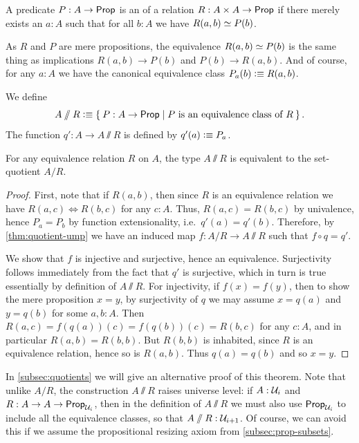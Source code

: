 \begin{defn}
  A predicate $P:A\to\mathsf{Prop}$ is an 
  of a relation $R : A \times A \to \mathsf{Prop}$ if there merely exists an $a:A$ such that for all $b:A$ we have $R(a,b) \simeq P(b)$.
\end{defn}

As $R$ and $P$ are mere propositions, the equivalence $R(a,b) \simeq P(b)$ is the same thing as implications $R(a,b) \to P(b)$ and $P(b) \to R(a,b)$.
And of course, for any $a:A$ we have the canonical equivalence class $P_a(b) \vcentcolon\equiv R(a,b)$.

\begin{defn}\label{def:VVquotient}
  We define
  \begin{equation*}
    A\sslash R \defeq \setof{ P:A\to\prop | P \text{ is an equivalence class of } R}.
  \end{equation*}
  The function $q':A\to A\sslash R$ is defined by $q'(a) \vcentcolon\equiv P_a$.
\end{defn}

\begin{thm}
  For any equivalence relation $R$ on $A$, the type $A\sslash R$ is equivalent to the set-quotient $A/R$.
\end{thm}
\begin{proof}
  First, note that if $R(a,b)$, then since $R$ is an equivalence relation we have $R(a,c) \Leftrightarrow R(b,c)$ for any $c:A$.
  Thus, $R(a,c) = R(b,c)$ by univalence, hence $P_a=P_b$ by function extensionality, i.e.\ $q'(a)=q'(b)$.
  Therefore, by \cref{thm:quotient-ump} we have an induced map $f:A/R \to A\sslash R$ such that $f\circ q = q'$.

  We show that $f$ is injective and surjective, hence an equivalence.
  Surjectivity follows immediately from the fact that $q'$ is surjective, which in turn is true essentially by definition of $A\sslash R$.
  For injectivity, if $f(x)=f(y)$, then to show the mere proposition $x=y$, by surjectivity of $q$ we may assume $x=q(a)$ and $y=q(b)$ for some $a,b:A$.
  Then $R(a,c) = f(q(a))(c) = f(q(b))(c) = R(b,c)$ for any $c:A$, and in particular $R(a,b) = R(b,b)$.
  But $R(b,b)$ is inhabited, since $R$ is an equivalence relation, hence so is $R(a,b)$.
  Thus $q(a)=q(b)$ and so $x=y$.
\end{proof}

In \cref{subsec:quotients} we will give an alternative proof of this theorem.
Note that unlike $A/R$, the construction $A\sslash R$ raises universe level: if $A:\mathcal{U}_i$ and $R:A\to A\to \mathsf{Prop}_{\mathcal{U}_i}$, then in the definition of $A\sslash R$ we must also use $\mathsf{Prop}_{\mathcal{U}_i}$ to include all the equivalence classes, so that $A\sslash R : \mathcal{U}_{i+1}$.
Of course, we can avoid this if we assume the propositional resizing axiom from \cref{subsec:prop-subsets}.

